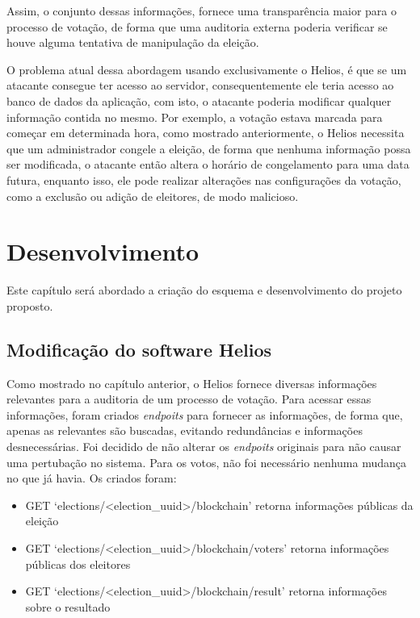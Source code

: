 \documentclass{ufsctex/ufsctex}
\begin{document}
\begin{lstlisting}[numbers=none]
\end{lstlisting}

Assim, o conjunto dessas informações, fornece uma transparência maior para o
processo de votação, de forma que uma auditoria externa poderia verificar se
houve alguma tentativa de manipulação da eleição. 

O problema atual dessa abordagem usando exclusivamente o Helios, é que se um
atacante consegue ter acesso ao servidor, consequentemente ele teria acesso ao
banco de dados da aplicação, com isto, o atacante poderia modificar qualquer
informação contida no mesmo. Por exemplo, a votação estava marcada para começar
em determinada hora, como mostrado anteriormente, o Helios necessita que um
administrador congele a eleição, de forma que nenhuma informação possa ser
modificada, o atacante então altera o horário de congelamento para uma data
futura, enquanto isso, ele pode realizar alterações nas configurações da
votação, como a exclusão ou adição de eleitores, de modo malicioso.


\chapter{Desenvolvimento}

Este capítulo será abordado a criação do esquema e desenvolvimento do projeto
proposto.

\section{Modificação do software Helios} 

Como mostrado no capítulo anterior, o Helios fornece diversas informações
relevantes para a auditoria de um processo de votação. Para acessar essas
informações, foram criados \textit{endpoits} para fornecer as informações, de
forma que, apenas as relevantes são buscadas, evitando redundâncias e
informações desnecessárias. Foi decidido de não alterar os \textit{endpoits}
originais para não causar uma pertubação no sistema. Para os votos, não foi
necessário nenhuma mudança no que já havia. Os criados foram:

\begin{itemize}
	\item GET `elections/<election\_uuid>/blockchain' retorna 
		informações públicas da eleição
	\item GET `elections/<election\_uuid>/blockchain/voters' retorna 
		informações públicas dos eleitores
	\item GET `elections/<election\_uuid>/blockchain/result' retorna
		informações sobre o resultado
\end{itemize}
\end{document}
